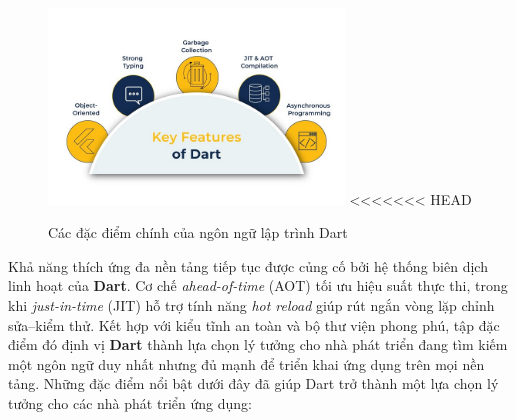 \documentclass[../DoAn.tex]{subfiles}
\numberwithin{figure}{chapter}
\begin{document}
\begin{figure}[H]
    \centering
    \includegraphics[width=0.7\textwidth]{Hinhve/dartFeatures.jpg}
<<<<<<< HEAD
    \caption{Các đặc điểm chính của ngôn ngữ lập trình Dart}
    \label{fig:dartimg}
\end{figure}

Khả năng thích ứng đa nền tảng tiếp tục được củng cố bởi hệ thống biên dịch linh hoạt của \textbf{Dart}. Cơ chế \emph{ahead-of-time} (AOT) tối ưu hiệu suất thực thi, trong khi \emph{just-in-time} (JIT) hỗ trợ tính năng \emph{hot reload} giúp rút ngắn vòng lặp chỉnh sửa–kiểm thử. Kết hợp với kiểu tĩnh an toàn và bộ thư viện phong phú, tập đặc điểm đó định vị \textbf{Dart} thành lựa chọn lý tưởng cho nhà phát triển đang tìm kiếm một ngôn ngữ duy nhất nhưng đủ mạnh để triển khai ứng dụng trên mọi nền tảng. Những đặc điểm nổi bật dưới đây đã giúp Dart trở thành một lựa chọn lý tưởng cho các nhà phát triển ứng dụng:
\end{document}
